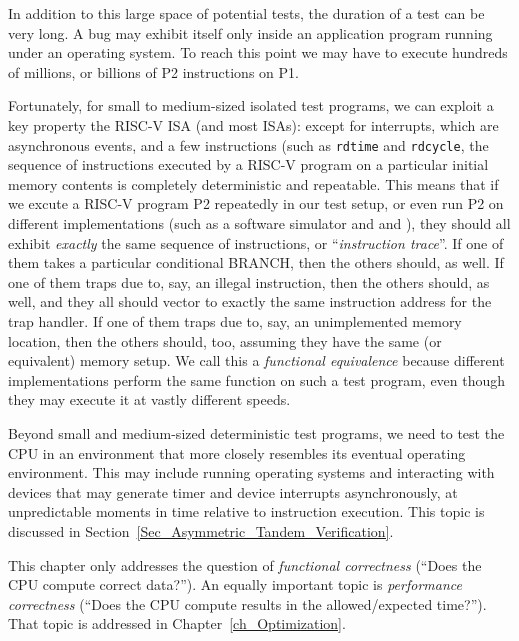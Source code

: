 In addition to this large space of potential tests, the duration of a
test can be very long.  A bug may exhibit itself only inside an
application program running under an operating system.  To reach this
point we may have to execute hundreds of millions, or billions of P2
instructions on P1.

Fortunately, for small to medium-sized isolated test programs, we can
exploit a key property the RISC-V ISA (and most ISAs): except for
interrupts, which are asynchronous events, and a few instructions
(such as \verb|rdtime| and \verb|rdcycle|, the sequence of
instructions executed by a RISC-V program on a particular initial
memory contents is completely deterministic and repeatable.  This
means that if we excute a RISC-V program P2 repeatedly in our test
setup, or even run P2 on different implementations (such as a software
simulator and {\DRUM} and {\FIFE}), they should all exhibit \emph{exactly}
the same sequence of instructions, or ``\emph{instruction trace}''.
If one of them takes a particular conditional BRANCH, then the others
should, as well.  If one of them traps due to, say, an illegal
instruction, then the others should, as well, and they all should
vector to exactly the same instruction address for the trap handler.
If one of them traps due to, say, an unimplemented memory location,
then the others should, too, assuming they have the same (or
equivalent) memory setup.  We call this a \emph{functional
equivalence} because different implementations perform the same
function on such a test program, even though they may execute it at
vastly different speeds.

Beyond small and medium-sized deterministic test programs, we need to
test the CPU in an environment that more closely resembles its
eventual operating environment.  This may include running operating
systems and interacting with devices that may generate timer and
device interrupts asynchronously, {\ie} at unpredictable moments in
time relative to instruction execution.  This topic is discussed in
Section~\ref{Sec_Asymmetric_Tandem_Verification}.

This chapter only addresses the question of \emph{functional
correctness} (``Does the CPU compute correct data?'').  An equally
important topic is \emph{performance correctness} (``Does the CPU
compute results in the allowed/expected time?'').  That topic is
addressed in Chapter~\ref{ch_Optimization}.


